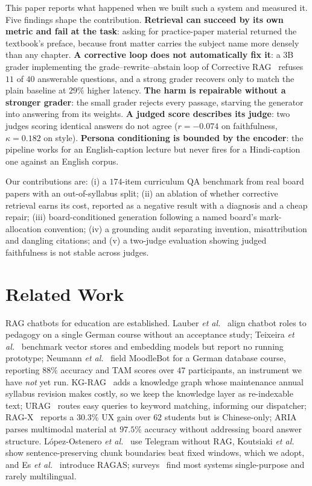 \documentclass[conference]{IEEEtran}
\begin{document}
This paper reports what happened when we built such a system and measured it.
Five findings shape the contribution. \textbf{Retrieval can succeed by its own
metric and fail at the task}: asking for practice-paper material returned the
textbook's preface, because front matter carries the subject name more densely
than any chapter. \textbf{A corrective loop does not automatically fix it}: a
$3$B grader implementing the grade--rewrite--abstain loop of Corrective
RAG~\cite{yan2024crag} refuses $11$ of $40$ answerable questions, and a strong
grader recovers only to match the plain baseline at $29\%$ higher latency.
\textbf{The harm is repairable without a stronger grader}: the small grader
rejects every passage, starving the generator into answering from its weights.
\textbf{A judged score describes its judge}: two judges scoring identical
answers do not agree ($r = -0.074$ on faithfulness, $\kappa = 0.182$ on style).
\textbf{Persona conditioning is bounded by the encoder}: the pipeline works for
an English-caption lecture but never fires for a Hindi-caption one against an
English corpus.

Our contributions are: (i) a $174$-item curriculum QA benchmark from real board
papers with an out-of-syllabus split; (ii) an ablation of whether corrective
retrieval earns its cost, reported as a negative result with a diagnosis and a
cheap repair; (iii) board-conditioned generation following a named board's
mark-allocation convention; (iv) a grounding audit separating invention,
misattribution and dangling citations; and (v) a two-judge evaluation showing
judged faithfulness is not stable across judges.

\section{Related Work}
RAG chatbots for education are established. Lauber \textit{et
al.}~\cite{lauber2025} align chatbot roles to pedagogy on a single German course
without an acceptance study; Teixeira \textit{et al.}~\cite{teixeira2025}
benchmark vector stores and embedding models but report no running prototype;
Neumann \textit{et al.}~\cite{neumann2025} field MoodleBot for a German database
course, reporting $88\%$ accuracy and TAM scores over $47$ participants, an
instrument we have \emph{not} yet run. KG-RAG~\cite{dong2025} adds a knowledge
graph whose maintenance annual syllabus revision makes costly, so we keep the
knowledge layer as re-indexable text; URAG~\cite{nguyen2025} routes easy queries
to keyword matching, informing our dispatcher; RAG-X~\cite{he2025} reports a
$30.3\%$ UX gain over $62$ students but is Chinese-only;
ARIA~\cite{luo2026} parses multimodal material at $97.5\%$ accuracy without
addressing board answer structure. L\'opez-Ostenero \textit{et
al.}~\cite{gielis2025} use Telegram without RAG, Koutsiaki \textit{et
al.}~\cite{koutsiaki2025} show sentence-preserving chunk boundaries beat fixed
windows, which we adopt, and Es \textit{et al.}~\cite{es2025} introduce RAGAS;
surveys~\cite{kuhail2023,wollny2021} find most systems single-purpose and rarely
multilingual.
\end{document}
